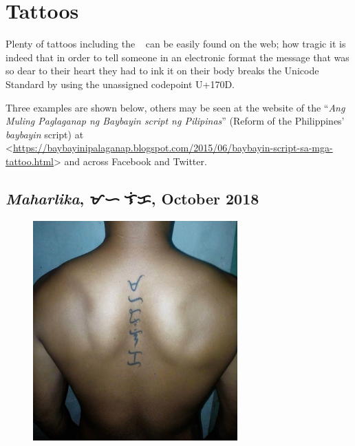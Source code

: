 \documentclass[a4paper,pagesize,openany,14pt,parskip=never]{scrbook}
\newcommand{\≈}{$\approx$}
\newcommand{\ra}{{\baybayin ᜍ}}
\begin{document}
\section{Tattoos}

Plenty of tattoos including the \ra\ can be easily found on the web; how tragic it is indeed that in order to tell someone in an electronic format the message that was so dear to their heart they had to ink it on their body breaks the Unicode Standard by using the unassigned codepoint U+170D.

Three examples are shown below, others may be seen at the website of the ``{\em Ang Muling Paglaganap ng Baybayin script ng Pilipinas}'' (Reform of the Philippines' {\em baybayin} script) at <\url{https://baybayinipalaganap.blogspot.com/2015/06/baybayin-script-sa-mga-tattoo.html}> and across Facebook and Twitter.

\subsection{{\em Maharlika}, {\baybayin ᜋᜑᜍ᜔ᜎᜒᜃ}, October 2018}
\label{Maharlika}
\begin{figure}[H]
\includegraphics[width=0.7\textwidth]{Maharlika}
\end{figure}
\end{document}
